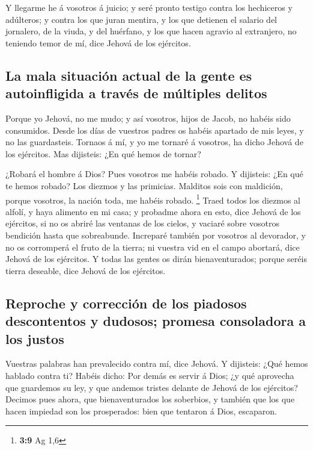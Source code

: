  Y llegarme he á vosotros á juicio; y seré pronto testigo
contra los hechiceros y adúlteros; y contra los que juran mentira, y los
que detienen el salario del jornalero, de la viuda, y del huérfano, y
los que hacen agravio al extranjero, no teniendo temor de mí, dice
Jehová de los ejércitos.

\hypertarget{la-mala-situaciuxf3n-actual-de-la-gente-es-autoinfligida-a-travuxe9s-de-muxfaltiples-delitos}{%
\subsection{La mala situación actual de la gente es autoinfligida a
través de múltiples
delitos}\label{la-mala-situaciuxf3n-actual-de-la-gente-es-autoinfligida-a-travuxe9s-de-muxfaltiples-delitos}}

 Porque yo Jehová, no me mudo; y así vosotros, hijos de
Jacob, no habéis sido consumidos.  Desde los días de
vuestros padres os habéis apartado de mis leyes, y no las guardasteis.
Tornaos á mí, y yo me tornaré á vosotros, ha dicho Jehová de los
ejércitos. Mas dijisteis: ¿En qué hemos de tornar?

 ¿Robará el hombre á Dios? Pues vosotros me habéis robado.
Y dijisteis: ¿En qué te hemos robado? Los diezmos y las primicias.
 Malditos sois con maldición, porque vosotros, la nación
toda, me habéis robado. \footnote{\textbf{3:9} Ag 1,6} 
Traed todos los diezmos al alfolí, y haya alimento en mi casa; y
probadme ahora en esto, dice Jehová de los ejércitos, si no os abriré
las ventanas de los cielos, y vaciaré sobre vosotros bendición hasta que
sobreabunde.  Increparé también por vosotros al
devorador, y no os corromperá el fruto de la tierra; ni vuestra vid en
el campo abortará, dice Jehová de los ejércitos.  Y todas
las gentes os dirán bienaventurados; porque seréis tierra deseable, dice
Jehová de los ejércitos.

\hypertarget{reproche-y-correcciuxf3n-de-los-piadosos-descontentos-y-dudosos-promesa-consoladora-a-los-justos}{%
\subsection{Reproche y corrección de los piadosos descontentos y
dudosos; promesa consoladora a los
justos}\label{reproche-y-correcciuxf3n-de-los-piadosos-descontentos-y-dudosos-promesa-consoladora-a-los-justos}}

 Vuestras palabras han prevalecido contra mí, dice
Jehová. Y dijisteis: ¿Qué hemos hablado contra ti? 
Habéis dicho: Por demás es servir á Dios; ¿y qué aprovecha que guardemos
su ley, y que andemos tristes delante de Jehová de los ejércitos?
 Decimos pues ahora, que bienaventurados los soberbios, y
también que los que hacen impiedad son los prosperados: bien que
tentaron á Dios, escaparon.


